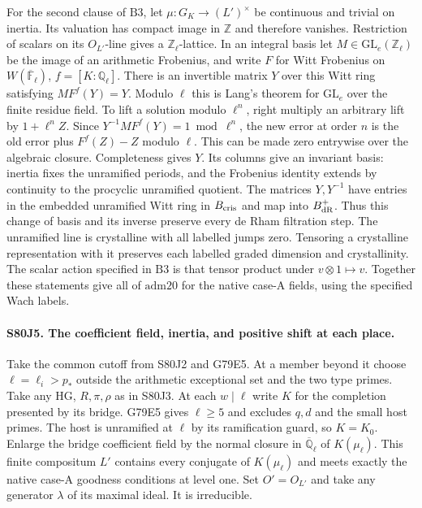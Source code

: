 For the second clause of $\mathrm{B3}$, let $\mu:G_K\to (L')^\times$
be continuous and trivial on inertia. Its valuation has compact
image in $\mathbb Z$ and therefore vanishes. Restriction of scalars
on its $O_{L'}$-line gives a $\mathbb Z_\ell$-lattice. In an integral
basis let $M\in\mathrm{GL}_e(\mathbb Z_\ell)$ be the image of an
arithmetic Frobenius, and write $F$ for Witt Frobenius on
$W(\overline{\mathbb F}_\ell)$, $f=[K:\mathbb Q_\ell]$.
There is an invertible matrix $Y$ over this Witt ring satisfying
$M F^f(Y)=Y$. Modulo $\ell$ this is Lang's theorem for
$\mathrm{GL}_e$ over the finite residue field. To lift a solution
modulo $\ell^n$, right multiply an arbitrary lift by $1+\ell^n Z$.
Since $Y^{-1}MF^f(Y)=1\bmod\ell^n$, the new error at order $n$
is the old error plus $F^f(Z)-Z$ modulo $\ell$. This can be made
zero entrywise over the algebraic closure. Completeness gives $Y$.
Its columns give an invariant basis: inertia fixes the unramified
periods, and the Frobenius identity extends by continuity to the
procyclic unramified quotient. The matrices $Y,Y^{-1}$ have entries in the embedded unramified
Witt ring in $B_{\rm cris}$ and map into $B_{\rm dR}^+$. Thus this
change of basis and its inverse preserve every de Rham filtration step. The unramified
line is crystalline with all labelled jumps zero. Tensoring a
crystalline representation with it preserves each labelled graded
dimension and crystallinity. The scalar action specified in
$\mathrm{B3}$ is that tensor product under $v\otimes1\mapsto v$.
Together these statements give all of $\mathrm{adm20}$ for the
native case-A fields, using the specified Wach labels.

\paragraph{S80J5. The coefficient field, inertia, and positive shift at each place.}
Take the common cutoff from S80J2 and G79E5. At a member beyond it
choose $\ell=\ell_i>p_*$ outside the arithmetic exceptional set
and the two type primes. Take any $\mathrm{HG}$, $R,\pi,\rho$
as in S80J3. At each $w\mid\ell$ write $K$ for the completion
presented by its bridge. G79E5 gives $\ell\ge5$ and excludes $q,d$
and the small host primes. The host is unramified at $\ell$ by
its ramification guard, so $K=K_0$. Enlarge the bridge coefficient
field by the normal closure in $\overline{\mathbb Q}_\ell$ of
$K(\mu_\ell)$. This finite compositum $L'$ contains every conjugate
of $K(\mu_\ell)$ and meets exactly the native case-A goodness
conditions at level one. Set $O'=O_{L'}$ and take any generator
$\lambda$ of its maximal ideal. It is irreducible.

